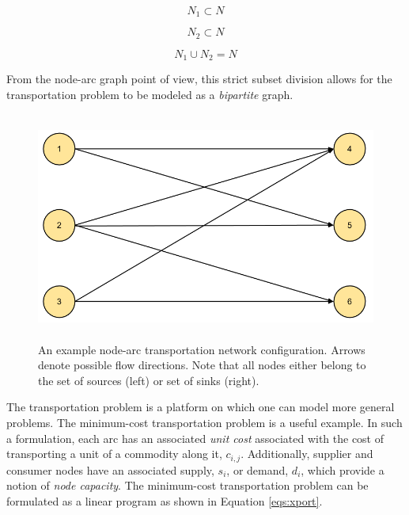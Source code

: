 \begin{equation}
  N_1 \subset N
\end{equation}

\begin{equation}
 N_2 \subset N
\end{equation}

\begin{equation}
  N_1 \cup N_2 = N
\end{equation}

From the node-arc graph point of view, this strict subset division allows for
the transportation problem to be modeled as a \textit{bipartite} graph.

\begin{figure}[H]
  \begin{center}
    \includegraphics[height=7.5cm]{./chapters/1-intro/figs/node-arcs-bipartite.png}
  \caption{An example node-arc transportation network configuration. Arrows
    denote possible flow directions. Note that all nodes either belong to the 
    set of sources (left) or set of sinks (right).}
  \label{fig:node-arcs-bipartite}
  \end{center}
\end{figure}

The transportation problem is a platform on which one can model more general
problems. The minimum-cost transportation problem is a useful example. In such a
formulation, each arc has an associated \textit{unit cost} associated with the
cost of transporting a unit of a commodity along it, $c_{i,j}$. Additionally,
supplier and consumer nodes have an associated supply, $s_i$, or demand, $d_i$,
which provide a notion of \textit{node capacity}. The minimum-cost
transportation problem can be formulated as a linear program as shown in
Equation \ref{eqs:xport}.

